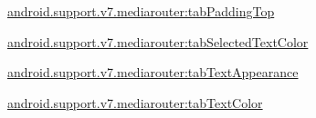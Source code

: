 {\ttfamily \hyperlink{classandroid_1_1support_1_1v7_1_1mediarouter_1_1R_1_1styleable_a618b0933d1820264a2c2a9ce7e411adc}{android.\+support.\+v7.\+mediarouter\+:tab\+Padding\+Top}}

{\ttfamily \hyperlink{classandroid_1_1support_1_1v7_1_1mediarouter_1_1R_1_1styleable_ab2614637dac3cf097bf39bb86f81cddf}{android.\+support.\+v7.\+mediarouter\+:tab\+Selected\+Text\+Color}}

{\ttfamily \hyperlink{classandroid_1_1support_1_1v7_1_1mediarouter_1_1R_1_1styleable_a6fa243786142fa47217b312962fc4848}{android.\+support.\+v7.\+mediarouter\+:tab\+Text\+Appearance}}

{\ttfamily \hyperlink{classandroid_1_1support_1_1v7_1_1mediarouter_1_1R_1_1styleable_a0fcf5d47b23b3827d92116fbdb4b4028}{android.\+support.\+v7.\+mediarouter\+:tab\+Text\+Color}}

